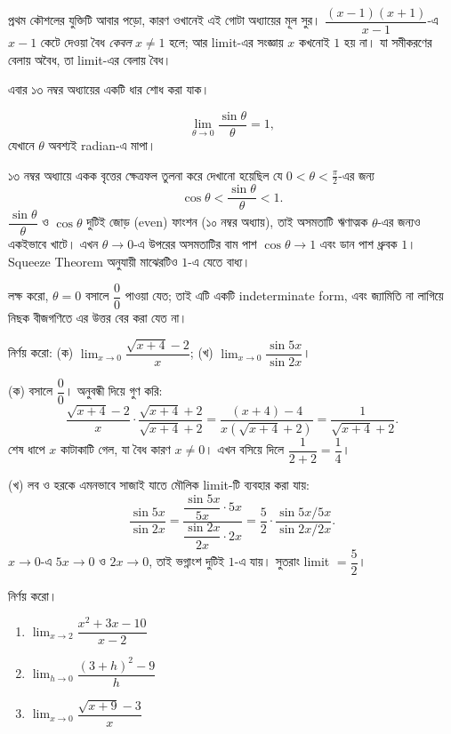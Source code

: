 \documentclass[11pt]{article}
\begin{document}
প্রথম কৌশলের যুক্তিটি আবার পড়ো, কারণ ওখানেই এই গোটা অধ্যায়ের মূল সুর।
$\dfrac{(x-1)(x+1)}{x-1}$-এ $x-1$ কেটে দেওয়া বৈধ \emph{কেবল} $x \neq 1$ হলে;
আর limit-এর সংজ্ঞায় $x$ কখনোই $1$ হয় না। যা সমীকরণের বেলায় অবৈধ, তা limit-এর বেলায় বৈধ।
 
এবার ১৩ নম্বর অধ্যায়ের একটি ধার শোধ করা যাক।

\begin{idea}[মৌলিক ত্রিকোণমিতিক limit]
\[
  \lim_{\theta \to 0} \frac{\sin\theta}{\theta} = 1 ,
\]
যেখানে $\theta$ অবশ্যই radian-এ মাপা।
\end{idea}

১৩ নম্বর অধ্যায়ে একক বৃত্তের ক্ষেত্রফল তুলনা করে দেখানো হয়েছিল যে
$0 < \theta < \tfrac{\pi}{2}$-এর জন্য
\[
  \cos\theta < \frac{\sin\theta}{\theta} < 1 .
\]
$\dfrac{\sin\theta}{\theta}$ ও $\cos\theta$ দুটিই জোড় (even) ফাংশন (১০ নম্বর
অধ্যায়), তাই অসমতাটি ঋণাত্মক $\theta$-এর জন্যও একইভাবে খাটে। এখন
$\theta \to 0$-এ উপরের অসমতাটির বাম পাশ $\cos\theta \to 1$ এবং ডান পাশ ধ্রুবক $1$। Squeeze
Theorem অনুযায়ী মাঝেরটিও $1$-এ যেতে বাধ্য।

লক্ষ করো, $\theta = 0$ বসালে $\dfrac{0}{0}$ পাওয়া যেত; তাই এটি একটি
indeterminate form, এবং জ্যামিতি না লাগিয়ে নিছক বীজগণিতে এর উত্তর বের করা
যেত না।

\begin{example}
নির্ণয় করো: (ক) $\lim_{x \to 0} \dfrac{\sqrt{x+4}-2}{x}$;
(খ) $\lim_{x \to 0} \dfrac{\sin 5x}{\sin 2x}$।
\end{example}

\begin{solbox}
(ক) বসালে $\dfrac{0}{0}$। অনুবন্ধী দিয়ে গুণ করি:
\[
  \frac{\sqrt{x+4}-2}{x} \cdot \frac{\sqrt{x+4}+2}{\sqrt{x+4}+2}
  = \frac{(x+4)-4}{x\left( \sqrt{x+4}+2 \right)}
  = \frac{1}{\sqrt{x+4}+2} .
\]
শেষ ধাপে $x$ কাটাকাটি গেল, যা বৈধ কারণ $x \neq 0$। এখন বসিয়ে দিলে
$\dfrac{1}{2+2} = \dfrac{1}{4}$।

(খ) লব ও হরকে এমনভাবে সাজাই যাতে মৌলিক limit-টি ব্যবহার করা যায়:
\[
  \frac{\sin 5x}{\sin 2x}
  = \frac{\dfrac{\sin 5x}{5x} \cdot 5x}{\dfrac{\sin 2x}{2x} \cdot 2x}
  = \frac{5}{2} \cdot \frac{\sin 5x / 5x}{\sin 2x / 2x} .
\]
$x \to 0$-এ $5x \to 0$ ও $2x \to 0$, তাই ভগ্নাংশ দুটিই $1$-এ যায়। সুতরাং
limit $= \dfrac{5}{2}$।
\end{solbox}

 নির্ণয় করো।
\begin{enumerate}
  \item $\lim_{x \to 2} \dfrac{x^{2}+3x-10}{x-2}$
  \item $\lim_{h \to 0} \dfrac{(3+h)^{2}-9}{h}$
  \item $\lim_{x \to 0} \dfrac{\sqrt{x+9}-3}{x}$
\end{enumerate}
\end{document}
